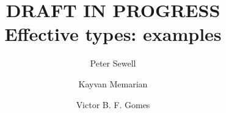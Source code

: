 \documentclass[acmsmall,review,screen]{acmart}\settopmatter{printfolios=true,printccs=false,printacmref=false}
\newif\ifWGfourteennumber
\begin{document}
\ifWGfourteennumber
\fancypagestyle{firstpagestyle}{%
\fancyhf{} %
\fancyhead[C]{ISO/IEC JTC1/SC22/WG14 N2311, 2018-11-09} %
\renewcommand{\headrulewidth}{0pt}
\renewcommand{\footrulewidth}{0pt}}
\thispagestyle{plain}
\fi

\title[Effective types: examples]{DRAFT IN PROGRESS\\Effective types: examples}


\authorsaddresses{}

\author{Peter Sewell}

 \author{Kayvan Memarian}
% 
% 
 \author{Victor B. F. Gomes}

\renewcommand{\shortauthors}{Sewell, Memarian, Gomes}

\end{document}

